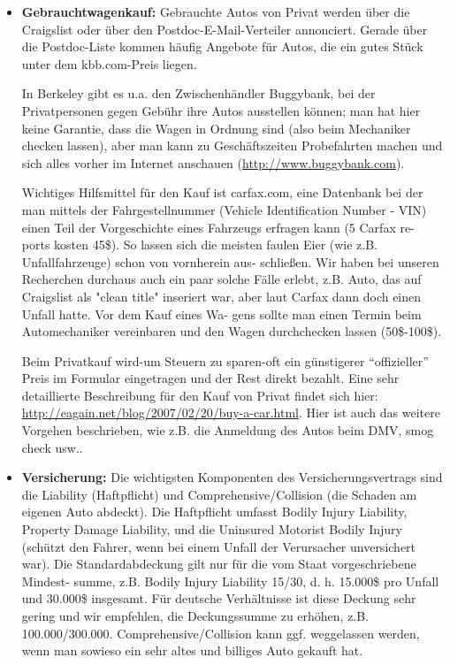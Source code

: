 \documentclass[a4paper]{scrreprt}
\begin{document}
\begin{itemize}
	\item \textbf{Gebrauchtwagenkauf:} Gebrauchte Autos von Privat werden über die Craigslist oder über den Postdoc-E-Mail-Verteiler annonciert. Gerade über die Postdoc-Liste kommen häufig Angebote für Autos, die ein gutes Stück unter dem kbb.com-Preis liegen.

	In Berkeley gibt es u.a. den Zwischenhändler Buggybank, bei der Privatpersonen gegen Gebühr ihre Autos ausstellen können; man hat hier keine Garantie, dass die Wagen in Ordnung sind (also beim Mechaniker checken lassen), aber man kann zu Geschäftszeiten Probefahrten machen und sich alles vorher im Internet anschauen (\url{http://www.buggybank.com}).
	
	Wichtiges Hilfsmittel für den Kauf ist carfax.com, eine Datenbank bei der man mittels der Fahrgestellnummer (Vehicle Identification Number - VIN) einen Teil der Vorgeschichte eines Fahrzeugs erfragen kann (5 Carfax re- ports kosten 45\$). So lassen sich die meisten faulen Eier (wie z.B. Unfallfahrzeuge) schon von vornherein aus- schließen. Wir haben bei unseren Recherchen durchaus auch ein paar solche Fälle erlebt, z.B. Auto, das auf Craigslist als "clean title" inseriert war, aber laut Carfax dann doch einen Unfall hatte. Vor dem Kauf eines Wa- gens sollte man einen Termin beim Automechaniker vereinbaren und den Wagen durchchecken lassen (50\$-100\$).

	Beim Privatkauf wird-um Steuern zu sparen-oft ein günstigerer "`offizieller"' Preis im Formular eingetragen und der Rest direkt bezahlt. Eine sehr detaillierte Beschreibung für den Kauf von Privat findet sich hier: \url{http://eagain.net/blog/2007/02/20/buy-a-car.html}. Hier ist auch das weitere Vorgehen beschrieben, wie z.B. die Anmeldung des Autos beim DMV, smog check usw..
	
	\item \textbf{Versicherung:} Die wichtigsten Komponenten des Versicherungsvertrags sind die Liability (Haftpflicht) und Comprehensive/Collision (die Schaden am eigenen Auto abdeckt). Die Haftpflicht umfasst Bodily Injury Liability, Property Damage Liability, und die Uninsured Motorist Bodily Injury (schützt den Fahrer, wenn bei einem Unfall der Verursacher unversichert war). Die Standardabdeckung gilt nur für die vom Staat vorgeschriebene Mindest- summe, z.B. Bodily Injury Liability 15/30, d. h. 15.000\$ pro Unfall und 30.000\$ insgesamt. Für deutsche Verhältnisse ist diese Deckung sehr gering und wir empfehlen, die Deckungssumme zu erhöhen, z.B. 100.000/300.000. Comprehensive/Collision kann ggf. weggelassen werden, wenn man sowieso ein sehr altes und billiges Auto gekauft hat.


\end{itemize}
\end{document}
